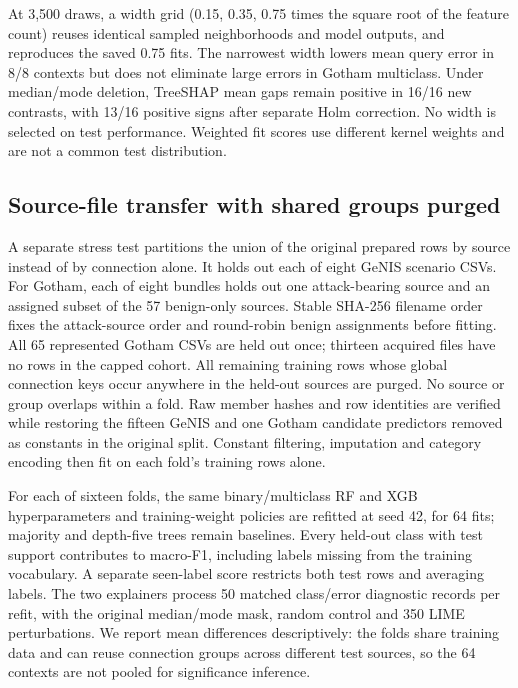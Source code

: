 \documentclass[conference,letterpaper]{IEEEtran}
\begin{document}
At 3,500 draws, a width grid (0.15, 0.35, 0.75 times the square root of the feature count) reuses identical sampled neighborhoods and model outputs, and reproduces the saved 0.75 fits. The narrowest width lowers mean query error in 8/8 contexts but does not eliminate large errors in Gotham multiclass. Under median/mode deletion, TreeSHAP mean gaps remain positive in 16/16 new contrasts, with 13/16 positive signs after separate Holm correction. No width is selected on test performance. Weighted fit scores use different kernel weights and are not a common test distribution.

\subsection{Source-file transfer with shared groups purged}
A separate stress test partitions the union of the original prepared rows by source instead of by connection alone. It holds out each of eight GeNIS scenario CSVs. For Gotham, each of eight bundles holds out one attack-bearing source and an assigned subset of the 57 benign-only sources. Stable SHA-256 filename order fixes the attack-source order and round-robin benign assignments before fitting. All 65 represented Gotham CSVs are held out once; thirteen acquired files have no rows in the capped cohort. All remaining training rows whose global connection keys occur anywhere in the held-out sources are purged. No source or group overlaps within a fold. Raw member hashes and row identities are verified while restoring the fifteen GeNIS and one Gotham candidate predictors removed as constants in the original split. Constant filtering, imputation and category encoding then fit on each fold's training rows alone.

For each of sixteen folds, the same binary/multiclass RF and XGB hyperparameters and training-weight policies are refitted at seed 42, for 64 fits; majority and depth-five trees remain baselines. Every held-out class with test support contributes to macro-F1, including labels missing from the training vocabulary. A separate seen-label score restricts both test rows and averaging labels. The two explainers process 50 matched class/error diagnostic records per refit, with the original median/mode mask, random control and 350 LIME perturbations. We report mean differences descriptively: the folds share training data and can reuse connection groups across different test sources, so the 64 contexts are not pooled for significance inference.
\end{document}
